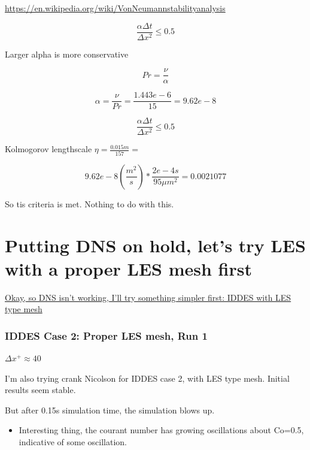 \documentclass[12pt]{article}
\renewcommand{\_}{\kern-1.5pt\textunderscore\kern-1.5pt}
\begin{document}
\href{https://en.wikipedia.org/wiki/Von_Neumann_stability_analysis}{https://en.wikipedia.org/wiki/Von\_Neumann\_stability\_analysis}\par

 \[ \frac{ \alpha  \Delta t}{ \Delta x^{2}} \leq 0.5 \] \par

Larger alpha is more conservative\par

 \[ Pr=\frac{ \nu }{ \alpha } \] \par

 \[  \alpha =\frac{ \nu }{Pr}=\frac{1.443e-6}{15}=9.62e-8  \] \par

 \[ \frac{ \alpha  \Delta t}{ \Delta x^{2}} \leq 0.5 \] \par

Kolmogorov lengthscale  \(  \eta =\frac{0.015m}{157}= \) \par

 \[ 9.62e-8 \left( \frac{m^{2}}{s} \right) \ast\frac{2e-4s}{95 \mu m^{2}}=0.0021077 \] \par

So tis criteria is met. Nothing to do with this.\par

\part{Putting DNS on hold, let's try LES with a proper LES mesh first}

\uline{Okay, so DNS isn’t working, I’ll try something simpler first: IDDES with LES type mesh}\par

\section{IDDES Case 2: Proper LES mesh, Run 1}
$\Delta x ^{+}\approx 40$

I’m also trying crank Nicolson for IDDES case 2, with LES type mesh. Initial results seem stable.\par

But after 0.15s simulation time, the simulation blows up.\par
\begin{itemize}
	\item Interesting thing, the courant number has growing oscillations about Co=0.5, indicative of some oscillation.\par
\end{itemize}
\end{document}

